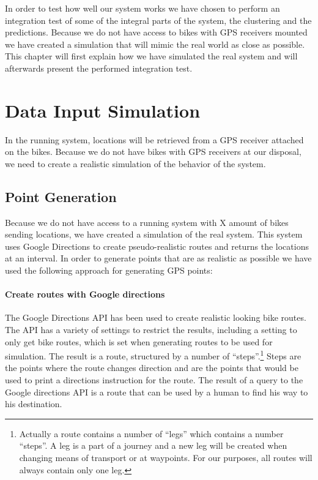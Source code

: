 In order to test how well our system works we have chosen to perform an integration test of some of the integral parts of the system, the clustering and the predictions.
Because we do not have access to bikes with GPS receivers mounted we have created a simulation that will mimic the real world as close as possible.
This chapter will first explain how we have simulated the real system and will afterwards present the performed integration test.

\section{Data Input Simulation}\label{design:datasimulation}
In the running system, locations will be retrieved from a GPS receiver attached on the bikes.
Because we do not have bikes with GPS receivers at our disposal, we need to create a realistic simulation of the behavior of the system.

\subsection{Point Generation} \label{inputsimulation:pointgeneration}
Because we do not have access to a running system with X amount of bikes sending locations, we have created a simulation of the real system.
This system uses Google Directions to create pseudo-realistic routes and returns the locations at an interval.
In order to generate points that are as realistic as possible we have used the following approach for generating GPS points:

\paragraph{Create routes with Google directions} The Google Directions API \cite{gdirections} has been used to create realistic looking bike routes.
The API has a variety of settings to restrict the results, including a setting to only get bike routes, which is set when generating routes to be used for simulation.
The result is a route, structured by a number of ``steps''.\footnote{Actually a route contains a number of  ``legs'' which contains a number ``steps''. 
A leg is a part of a journey and a new leg will be created when changing means of transport or at waypoints.
For our purposes, all routes will always contain only one leg.}
Steps are the points where the route changes direction and are the points that would be used to print a directions instruction for the route.
The result of a query to the Google directions API is a route that can be used by a human to find his way to his destination.

